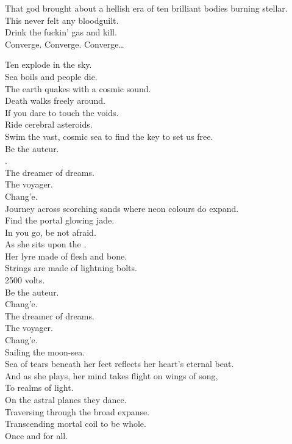 That god brought about a hellish era of ten brilliant bodies burning stellar. \\
This  never felt any bloodguilt. \\
Drink the fuckin' gas and kill. \\

Converge. Converge. Converge… \\



Ten  explode in the sky. \\
Sea boils and people die. \\
The earth quakes with a cosmic sound. \\
Death walks freely around. \\
If you dare to touch the voids. \\
Ride cerebral asteroids. \\
Swim the vast, cosmic sea to find the key to set us free. \\

Be the auteur. \\
. \\
The dreamer of dreams. \\
The voyager. \\
Chang'e. \\

Journey across scorching sands where neon colours do expand. \\
Find the portal glowing jade. \\
In you go, be not afraid. \\
As she sits upon the . \\
Her lyre made of flesh and bone. \\
Strings are made of lightning bolts. \\
2500 volts. \\

Be the auteur. \\
Chang'e. \\
The dreamer of dreams. \\
The voyager. \\
Chang'e. \\
Sailing the moon-sea. \\

Sea of tears beneath her feet reflects her heart's eternal beat. \\
And as she plays, her mind takes flight on wings of song, \\
To realms of light. \\
On the astral planes they dance. \\
Traversing through the broad expanse. \\
Transcending mortal coil to be whole. \\
Once and for all. \\

